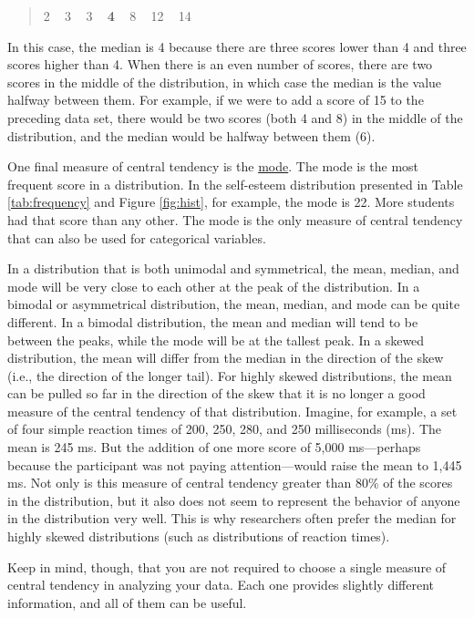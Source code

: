 \documentclass[
]{krantz}
\begin{document}
\begin{quote}
2 ~ 3 ~ 3 ~ \textbf{4} ~ 8 ~ 12 ~ 14
\end{quote}

In this case, the median is 4 because there are three scores lower than 4 and three scores higher than 4. When there is an even number of scores, there are two scores in the middle of the distribution, in which case the median is the value halfway between them. For example, if we were to add a score of 15 to the preceding data set, there would be two scores (both 4 and 8) in the middle of the distribution, and the median would be halfway between them (6).

One final measure of central tendency is the \protect\hyperlink{mode}{mode}. The mode is the most frequent score in a distribution. In the self-esteem distribution presented in Table \ref{tab:frequency} and Figure \ref{fig:hist}, for example, the mode is 22. More students had that score than any other. The mode is the only measure of central tendency that can also be used for categorical variables.

In a distribution that is both unimodal and symmetrical, the mean, median, and mode will be very close to each other at the peak of the distribution. In a bimodal or asymmetrical distribution, the mean, median, and mode can be quite different. In a bimodal distribution, the mean and median will tend to be between the peaks, while the mode will be at the tallest peak. In a skewed distribution, the mean will differ from the median in the direction of the skew (i.e., the direction of the longer tail). For highly skewed distributions, the mean can be pulled so far in the direction of the skew that it is no longer a good measure of the central tendency of that distribution. Imagine, for example, a set of four simple reaction times of 200, 250, 280, and 250 milliseconds (ms). The mean is 245 ms. But the addition of one more score of 5,000 ms---perhaps because the participant was not paying attention---would raise the mean to 1,445 ms. Not only is this measure of central tendency greater than 80\% of the scores in the distribution, but it also does not seem to represent the behavior of anyone in the distribution very well. This is why researchers often prefer the median for highly skewed distributions (such as distributions of reaction times).

Keep in mind, though, that you are not required to choose a single measure of central tendency in analyzing your data. Each one provides slightly different information, and all of them can be useful.
\end{document}
